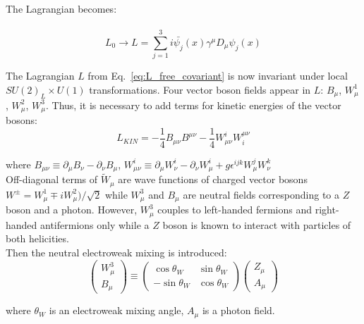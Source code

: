 The Lagrangian becomes:\\ \\

\begin{equation}\label{eq:L_free_covariant}
L_0 \rightarrow L = \sum_{j=1}^{3} i \bar{\psi_j}(x) \gamma^\mu D_\mu \psi_j(x) 
\end{equation}


The Lagrangian $L$ from Eq.~\ref{eq:L_free_covariant} is now invariant under local $SU(2)_L \times U(1)$ transformations. Four vector boson fields appear in $L$: $B_\mu$, $W_\mu^1$, $W_\mu^2$, $W_\mu^3$.  Thus, it is necessary to add terms for kinetic energies of the vector bosons:\\

\begin{equation} \label{eq:L_gauge_kin}
L_{KIN}=-\frac{1}{4}B_{\mu\nu}B^{\mu\nu}-\frac{1}{4}W_{\mu\nu}^i W^{\mu\nu}_i
\end{equation}

where $B_{\mu\nu} \equiv \partial_\mu B_\nu - \partial_\nu B_\mu$, $W_{\mu\nu}^i \equiv \partial_\mu W_\nu^i - \partial_\nu W_\mu^i + g \epsilon^{ijk} W_\mu^j W_\nu^k$\\

Off-diagonal terms of ${\tilde{W}}_\mu$ are wave functions of charged vector bosons $W^{\pm}=W_\mu^1 \mp i W_\mu^2)/{\sqrt{2}}$ while $W_\mu^3$ and $B_\mu$ are neutral fields corresponding to a $Z$ boson and a photon. However, $W_\mu^3$ couples to left-handed fermions and right-handed antifermions only while a $Z$ boson is known to interact with particles of both helicities.\\

Then the neutral electroweak mixing is introduced:\\

\begin{equation}
  \begin{pmatrix} W_\mu^3 \\ B_\mu \end{pmatrix} \equiv
  \begin{pmatrix} \cos \theta_W & \sin \theta_W \\ -\sin \theta_W & \cos \theta_W \end{pmatrix}
  \begin{pmatrix} Z_\mu \\ A_\mu \end{pmatrix}
\end{equation} 

where $\theta_W$ is an electroweak mixing angle, $A_\mu$ is a photon field.\\

